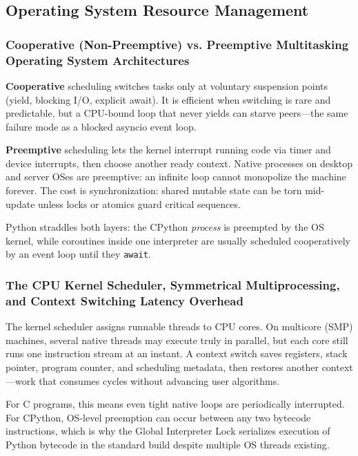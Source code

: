 \subsection{Operating System Resource Management}

\subsubsection{Cooperative (Non-Preemptive) vs. Preemptive Multitasking Operating System Architectures}

\textbf{Cooperative} scheduling switches tasks only at voluntary suspension points (yield, blocking I/O, explicit await). It is efficient when switching is rare and predictable, but a CPU-bound loop that never yields can starve peers---the same failure mode as a blocked asyncio event loop.

\textbf{Preemptive} scheduling lets the kernel interrupt running code via timer and device interrupts, then choose another ready context. Native processes on desktop and server OSes are preemptive: an infinite loop cannot monopolize the machine forever. The cost is synchronization: shared mutable state can be torn mid-update unless locks or atomics guard critical sequences.

Python straddles both layers: the CPython \emph{process} is preempted by the OS kernel, while coroutines inside one interpreter are usually scheduled cooperatively by an event loop until they \texttt{await}.

\subsubsection{The CPU Kernel Scheduler, Symmetrical Multiprocessing, and Context Switching Latency Overhead}

The kernel scheduler assigns runnable threads to CPU cores. On multicore (SMP) machines, several native threads may execute truly in parallel, but each core still runs one instruction stream at an instant. A context switch saves registers, stack pointer, program counter, and scheduling metadata, then restores another context---work that consumes cycles without advancing user algorithms.

For C programs, this means even tight native loops are periodically interrupted. For CPython, OS-level preemption can occur between any two bytecode instructions, which is why the Global Interpreter Lock serializes execution of Python bytecode in the standard build despite multiple OS threads existing.

